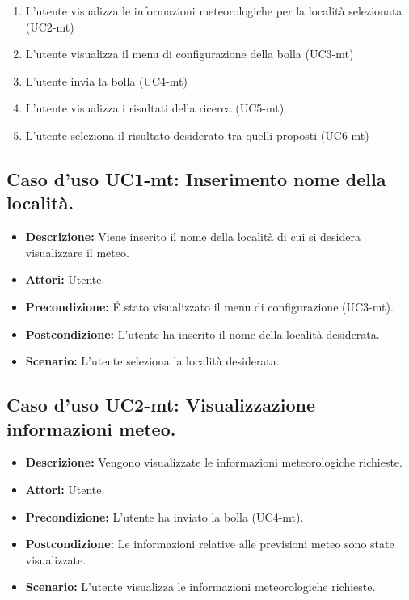 \begin{itemize}
\begin{enumerate}
\item L'utente visualizza le informazioni meteorologiche per la località selezionata (UC2-mt)

\item L'utente visualizza il menu di configurazione della bolla (UC3-mt)
\item L'utente invia la bolla (UC4-mt)

\item L'utente visualizza i risultati della ricerca (UC5-mt)
\item L'utente seleziona il risultato desiderato tra quelli proposti (UC6-mt)



\end{enumerate} 
\end{itemize}

\subsection{Caso d'uso UC1-mt: Inserimento nome della località.}
\begin{itemize}
\item[]\textbf{Descrizione:} Viene inserito il nome della località di cui si desidera visualizzare il meteo.
\item[]\textbf{Attori:} Utente. 
\item[]\textbf{Precondizione:} \'E stato visualizzato il menu di configurazione (UC3-mt). 
\item[]\textbf{Postcondizione:} L'utente ha inserito il nome della località desiderata. 
\item[]\textbf{Scenario:}
L'utente seleziona la località desiderata. 
\end{itemize}

\subsection{Caso d'uso UC2-mt: Visualizzazione informazioni meteo.}
\begin{itemize}
\item[]\textbf{Descrizione:} Vengono visualizzate le informazioni meteorologiche richieste.
\item[]\textbf{Attori:} Utente. 
\item[]\textbf{Precondizione:} L'utente ha inviato la bolla (UC4-mt). 
\item[]\textbf{Postcondizione:} Le informazioni relative alle previsioni meteo sono state visualizzate. 
\item[]\textbf{Scenario:}
L'utente visualizza le informazioni meteorologiche richieste. 
\end{itemize}

